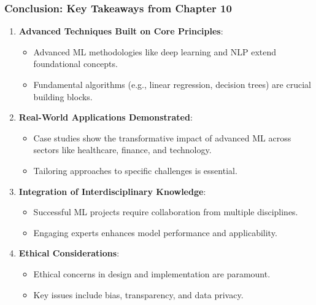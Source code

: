 \documentclass[aspectratio=169]{beamer}
\begin{document}
\begin{frame}[fragile]
    \frametitle{Conclusion: Key Takeaways from Chapter 10}
    \begin{enumerate}
        \item \textbf{Advanced Techniques Built on Core Principles}:
            \begin{itemize}
                \item Advanced ML methodologies like deep learning and NLP extend foundational concepts.
                \item Fundamental algorithms (e.g., linear regression, decision trees) are crucial building blocks.
            \end{itemize}
            
        \item \textbf{Real-World Applications Demonstrated}:
            \begin{itemize}
                \item Case studies show the transformative impact of advanced ML across sectors like healthcare, finance, and technology.
                \item Tailoring approaches to specific challenges is essential.
            \end{itemize}

        \item \textbf{Integration of Interdisciplinary Knowledge}:
            \begin{itemize}
                \item Successful ML projects require collaboration from multiple disciplines.
                \item Engaging experts enhances model performance and applicability.
            \end{itemize}

        \item \textbf{Ethical Considerations}:
            \begin{itemize}
                \item Ethical concerns in design and implementation are paramount.
                \item Key issues include bias, transparency, and data privacy.
            \end{itemize}
    \end{enumerate}
\end{frame}
\end{document}
